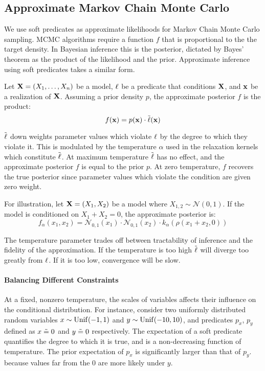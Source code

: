 \subsection{Approximate Markov Chain Monte Carlo}
We use soft predicates as approximate likelihoods for Markov Chain Monte Carlo sampling.
MCMC algorithms require a function $f$ that is proportional to the the target density.
In Bayesian inference this is the posterior, dictated by Bayes' theorem as the product of the likelihood and the prior.
Approximate inference using soft predicates takes a similar form.

\begin{definition}
Let $\mathbf{X} = (X_1, \dots, X_n)$ be a model, $\operatorname{\ell}$ be a predicate that conditions $\mathbf{X}$, and  $\mathbf{x}$ be a realization of $\mathbf{X}$.
Assuming a prior density $p$, the approximate posterior $f$ is the product:
\begin{equation}\label{fpm}
f(\mathbf{x}) = p(\mathbf{x}) \cdot \tilde{\operatorname{\ell}}(\mathbf{x})
  \end{equation}
\end{definition}
$\mathrel{\tilde{\operatorname{\ell}}}$ down weights parameter values which violate $\operatorname{\ell}$ by the degree to which they violate it. 
This is modulated by the temperature $\alpha$ used in the  relaxation kernels which constitute $\mathrel{\tilde{\operatorname{\ell}}}$.
At maximum temperature $\mathrel{\tilde{\operatorname{\ell}}}$ has no effect, and the approximate posterior $f$ is equal to the prior $p$.
At zero temperature, $f$ recovers the true posterior since parameter values which violate the condition are given zero weight.

For illustration, let $\mathbf{X} = (X_1, X_2)$ be a model where $X_{1,2} \sim \mathcal{N}(0, 1)$.
If the model is conditioned on $X_1 + X_2 = 0$, the approximate posterior is:
\begin{equation}\label{approxposterior}
f_\alpha(x_1, x_2) = \mathcal{N}_{0,1}(x_1) \cdot \mathcal{N}_{0,1}(x_2) \cdot k_\alpha(\rho(x_1 + x_2, 0)) 
\end{equation}

The temperature parameter trades off between tractability of inference and the fidelity of the approximation.
If the temperature is too high $\mathrel{\tilde{\operatorname{\ell}}}$ will diverge too greatly from $\operatorname{\ell}$. If it is too low, convergence will be slow.

\paragraph{Balancing Different Constraints}
At a fixed, nonzero temperature, the scales of variables affects their influence on
the conditional distribution.
For instance, consider two uniformly distributed random variables $x \sim \operatorname{Unif}(-1, 1)$ and $y \sim \operatorname{Unif}(-10, 10)$,
and predicates $p_x$, $p_y$ defined as $x \mathrel{\tilde{=}} 0$ and $y \mathrel{\tilde{=}} 0$ respectively.
The expectation of a soft predicate quantifies the degree to which it is true, and is a non-decreasing function of temperature.
The prior expectation of $p_x$ is significantly larger than that of $p_y$.
because values far from the 0 are more likely under $y$.

